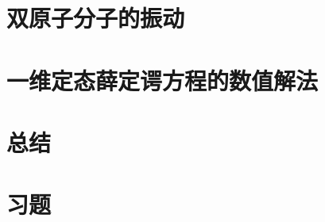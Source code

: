 \section{双原子分子的振动}
\label{sec:4.3 Vibrations of Diatomic Molecules}

\section{一维定态薛定谔方程的数值解法}
\label{sec:4.4 Numerical Solutions of the One-Dimensional Time-Independent Schrödinger Equation}

\section*{总结}

\section*{习题}

